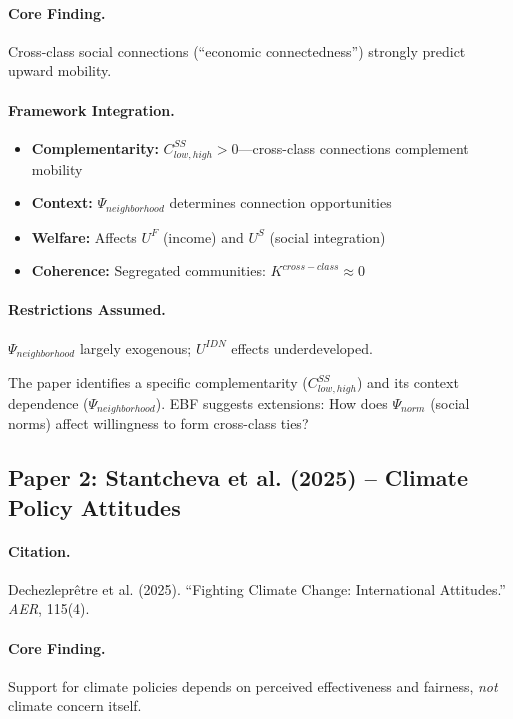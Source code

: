 \paragraph{Core Finding.}
Cross-class social connections (``economic connectedness'') strongly predict
upward mobility.

\paragraph{Framework Integration.}
\begin{itemize}
  \item \textbf{Complementarity:} $C^{SS}_{low,high} > 0$---cross-class connections
        complement mobility
  \item \textbf{Context:} $\Psi_{neighborhood}$ determines connection opportunities
  \item \textbf{Welfare:} Affects $U^F$ (income) and $U^S$ (social integration)
  \item \textbf{Coherence:} Segregated communities: $K^{cross-class} \approx 0$
\end{itemize}

\paragraph{Restrictions Assumed.}
$\Psi_{neighborhood}$ largely exogenous; $U^{IDN}$ effects underdeveloped.

\begin{tcolorbox}[colback=yellow!5!white, colframe=yellow!75!black,
    title=EBF Insight: Chetty et al.]
The paper identifies a specific complementarity ($C^{SS}_{low,high}$) and its
context dependence ($\Psi_{neighborhood}$). EBF suggests extensions: How does
$\Psi_{norm}$ (social norms) affect willingness to form cross-class ties?
\end{tcolorbox}


\subsection{Paper 2: Stantcheva et al. (2025) -- Climate Policy Attitudes}

\paragraph{Citation.}
Dechezleprêtre et al. (2025). ``Fighting Climate Change: International Attitudes.''
\emph{AER}, 115(4).

\paragraph{Core Finding.}
Support for climate policies depends on perceived effectiveness and fairness,
\emph{not} climate concern itself.

